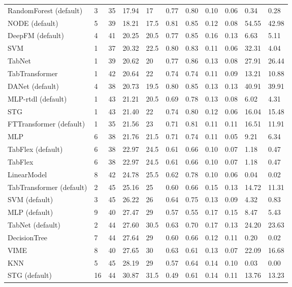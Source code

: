 \begin{tabular}{lllllllllll}
RandomForest (default) & 3 & 35 & 17.94 & 17 & 0.77 & 0.80 & 0.10 & 0.06 & 0.34 & 0.28 \\
NODE (default) & 5 & 39 & 18.21 & 17.5 & 0.81 & 0.85 & 0.12 & 0.08 & 54.55 & 42.98 \\
DeepFM (default) & 4 & 41 & 20.25 & 20.5 & 0.77 & 0.85 & 0.16 & 0.13 & 6.63 & 5.11 \\
SVM & 1 & 37 & 20.32 & 22.5 & 0.80 & 0.83 & 0.11 & 0.06 & 32.31 & 4.04 \\
TabNet & 1 & 39 & 20.62 & 20 & 0.77 & 0.86 & 0.13 & 0.08 & 27.91 & 26.44 \\
TabTransformer & 1 & 42 & 20.64 & 22 & 0.74 & 0.74 & 0.11 & 0.09 & 13.21 & 10.88 \\
DANet (default) & 4 & 38 & 20.73 & 19.5 & 0.80 & 0.85 & 0.13 & 0.13 & 40.91 & 39.91 \\
MLP-rtdl (default) & 1 & 43 & 21.21 & 20.5 & 0.69 & 0.78 & 0.13 & 0.08 & 6.02 & 4.31 \\
STG & 1 & 43 & 21.40 & 22 & 0.74 & 0.80 & 0.12 & 0.06 & 16.04 & 15.48 \\
FTTransformer (default) & 1 & 35 & 21.56 & 23 & 0.71 & 0.81 & 0.11 & 0.11 & 16.51 & 11.91 \\
MLP & 6 & 38 & 21.76 & 21.5 & 0.71 & 0.74 & 0.11 & 0.05 & 9.21 & 6.34 \\
TabFlex (default) & 6 & 38 & 22.97 & 24.5 & 0.61 & 0.66 & 0.10 & 0.07 & 1.18 & 0.47 \\
TabFlex & 6 & 38 & 22.97 & 24.5 & 0.61 & 0.66 & 0.10 & 0.07 & 1.18 & 0.47 \\
LinearModel & 8 & 42 & 24.78 & 25.5 & 0.62 & 0.78 & 0.10 & 0.06 & 0.04 & 0.02 \\
TabTransformer (default) & 2 & 45 & 25.16 & 25 & 0.60 & 0.66 & 0.15 & 0.13 & 14.72 & 11.31 \\
SVM (default) & 3 & 45 & 26.22 & 26 & 0.64 & 0.75 & 0.13 & 0.09 & 4.32 & 0.83 \\
MLP (default) & 9 & 40 & 27.47 & 29 & 0.57 & 0.55 & 0.17 & 0.15 & 8.47 & 5.43 \\
TabNet (default) & 2 & 44 & 27.60 & 30.5 & 0.63 & 0.70 & 0.17 & 0.13 & 24.20 & 23.63 \\
DecisionTree & 7 & 44 & 27.64 & 29 & 0.60 & 0.66 & 0.12 & 0.11 & 0.20 & 0.02 \\
VIME & 8 & 40 & 27.65 & 30 & 0.63 & 0.61 & 0.13 & 0.07 & 22.09 & 16.68 \\
KNN & 5 & 45 & 28.19 & 29 & 0.57 & 0.64 & 0.14 & 0.10 & 0.03 & 0.00 \\
STG (default) & 16 & 44 & 30.87 & 31.5 & 0.49 & 0.61 & 0.14 & 0.11 & 13.76 & 13.23 \\

\end{tabular}

